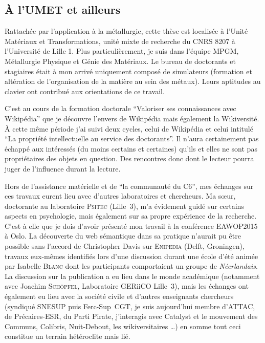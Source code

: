 \subsection{À l'UMET et ailleurs}
Rattachée par l'application à la métallurgie, cette thèse est localisée à l'Unité Matériaux et Transformations, unité mixte de recherche du CNRS 8207 à l'Université de Lille 1.
Plus particulièrement, je suis dans l'équipe MPGM, Métallurgie Physique et Génie des Matériaux.
Le bureau de doctorants et stagiaires était à mon arrivé uniquement composé de simulateurs (formation et altération de l'organisation de la matière au sein des métaux).
Leurs aptitudes au clavier ont contribué aux orientations de ce travail.

C'est au cours de la formation doctorale ``Valoriser ses connaissances avec Wikipédia'' que je découvre l'envers de Wikipédia mais également la Wikiversité.
À cette même période j'ai suivi deux cycles, celui de Wikipédia et celui intitulé ``La propriété intellectuelle au service des doctorants''.
Il n'aura certainement pas échappé aux intéressés (du moins certains et certaines) qu'ils et elles ne sont pas propriétaires des objets en question.
Des rencontres donc dont le lecteur pourra juger de l'influence durant la lecture.

Hors de l'assistance matérielle et de ``la communauté du C6'', mes échanges sur ces travaux eurent lieu avec d'autres laboratoires et chercheurs.
Ma sœur, doctorante au laboratoire \textsc{Psitec} (Lille~3), m'a évidement guidé sur certains aspects en psychologie, mais également sur sa propre expérience de la recherche.
C'est à elle que je dois d'avoir présenté mon travail à la conférence EAWOP2015 à Oslo.
La découverte du web sémantique dans sa pratique n'aurait pu être possible sans l'accord de Christopher Davis sur \textsc{Enipedia} (Delft, Groningen), travaux eux-mêmes identifiés lors d'une discussion durant une école d'été animée par Isabelle \textsc{Blanc} dont les participants comportaient un groupe de \emph{Néerlandais}.
La discussion sur la publication a eu lieu dans le monde académique (notamment avec Joachim \textsc{Schöpfel}, Laboratoire GERiiCO Lille~3), mais les échanges ont également eu lieu avec la société civile et d'autres enseignants chercheurs (syndiqué SNESUP puis Ferc-Sup~CGT, je suis aujourd'hui membre d'ATTAC, de Précaires-ESR, du Parti Pirate, j’interagis avec Catalyst et le mouvement des Communs, Colibris, Nuit-Debout, les wikiversitaires \ldots) en somme tout ceci constitue un terrain hétéroclite mais lié.

